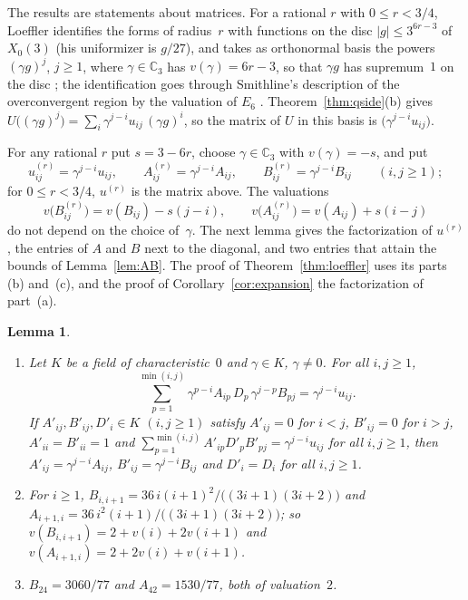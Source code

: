 \documentclass[11pt]{amsart}
\newtheorem{lemma}[theorem]{Lemma}
\theoremstyle{definition}
\numberwithin{equation}{section}
\newcommand{\lean}[1]{\ignorespaces}
\newcommand{\Cp}{\mathbb{C}_3}
\begin{document}
The results are statements about matrices. For a rational $r$ with $0\le r<3/4$, Loeffler identifies the forms of radius~$r$ with functions on the disc $|g|\le3^{6r-3}$ of $X_0(3)$ (his uniformizer is $g/27$), and takes as orthonormal basis the powers $(\gamma g)^j$, $j\ge1$, where $\gamma\in\Cp$ has $v(\gamma)=6r-3$, so that $\gamma g$ has supremum~$1$ on the disc \cite[\S2 and Appendix~A]{Loe07}; the identification goes through Smithline's description of the overconvergent region by the valuation of $E_6$ \cite[Proposition~3.5]{Smi07}. Theorem~\ref{thm:qside}(b) gives $U\bigl((\gamma g)^j\bigr)=\sum_i\gamma^{j-i}u_{ij}\,(\gamma g)^i$, so the matrix of $U$ in this basis is $\bigl(\gamma^{j-i}u_{ij}\bigr)$.

For any rational $r$ put $s=3-6r$, choose $\gamma\in\Cp$ with $v(\gamma)=-s$, and put
\[
u^{(r)}_{ij}=\gamma^{j-i}u_{ij},\qquad A^{(r)}_{ij}=\gamma^{j-i}A_{ij},\qquad B^{(r)}_{ij}=\gamma^{j-i}B_{ij}\qquad(i,j\ge1);
\]
for $0\le r<3/4$, $u^{(r)}$ is the matrix above. The valuations
\[
v\bigl(B^{(r)}_{ij}\bigr)=v(B_{ij})-s(j-i),\qquad v\bigl(A^{(r)}_{ij}\bigr)=v(A_{ij})+s(i-j)
\]
do not depend on the choice of~$\gamma$. The next lemma gives the factorization of $u^{(r)}$, the entries of $A$ and $B$ next to the diagonal, and two entries that attain the bounds of Lemma~\ref{lem:AB}. The proof of Theorem~\ref{thm:loeffler} uses its parts (b) and~(c), and the proof of Corollary~\ref{cor:expansion} the factorization of part~(a).

\begin{lemma}\label{lem:super}\lean{CalegariSlopes.Conj5.factorization, CalegariSlopes.Conj5.factors_unitTriangular, CalegariSlopes.Conj5.factorization_unique, CalegariSlopes.Conj5.ldu_unique, CalegariSlopes.Conj5.B_succ, CalegariSlopes.Conj5.A_succ, CalegariSlopes.Conj5.padicValRat_B_succ, CalegariSlopes.Conj5.padicValRat_A_succ, CalegariSlopes.Conj5.B_two_four, CalegariSlopes.Conj5.A_four_two, CalegariSlopes.Conj5.padicValRat_B_two_four, CalegariSlopes.Conj5.padicValRat_A_four_two}
\begin{enumerate}
\item[(a)] Let $K$ be a field of characteristic~$0$ and $\gamma\in K$, $\gamma\ne0$. For all $i,j\ge1$,
\[
\sum_{p=1}^{\min(i,j)}\gamma^{p-i}A_{ip}\,D_p\,\gamma^{j-p}B_{pj}=\gamma^{j-i}u_{ij}.
\]
If $A'_{ij},B'_{ij},D'_i\in K$ $(i,j\ge1)$ satisfy $A'_{ij}=0$ for $i<j$, $B'_{ij}=0$ for $i>j$, $A'_{ii}=B'_{ii}=1$ and $\sum_{p=1}^{\min(i,j)}A'_{ip}D'_pB'_{pj}=\gamma^{j-i}u_{ij}$ for all $i,j\ge1$, then $A'_{ij}=\gamma^{j-i}A_{ij}$, $B'_{ij}=\gamma^{j-i}B_{ij}$ and $D'_i=D_i$ for all $i,j\ge1$.
\item[(b)] For $i\ge1$, $B_{i,i+1}=36\,i(i+1)^2/\bigl((3i+1)(3i+2)\bigr)$ and $A_{i+1,i}=36\,i^2(i+1)/\bigl((3i+1)(3i+2)\bigr)$; so $v(B_{i,i+1})=2+v(i)+2v(i+1)$ and $v(A_{i+1,i})=2+2v(i)+v(i+1)$.
\item[(c)] $B_{24}=3060/77$ and $A_{42}=1530/77$, both of valuation~$2$.
\end{enumerate}
\end{lemma}
\end{document}

